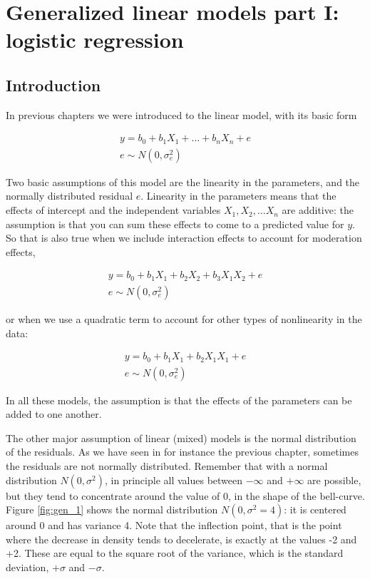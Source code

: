 \documentclass[]{report}\usepackage[]{graphicx}\usepackage[]{color}
\begin{document}
\chapter{Generalized linear models part I: logistic regression}\label{chap:logistic}

\section{Introduction}
In previous chapters we were introduced to the linear model, with its basic form


\begin{eqnarray}
y = b_0 + b_1 X_1 + \dots + b_n X_n + e \\
e \sim N(0, \sigma_e^2)
\end{eqnarray}

Two basic assumptions of this model are the linearity in the parameters, and the normally distributed residual $e$. Linearity in the parameters means that the effects of intercept and the independent variables $X_1, X_2, \dots X_n$ are additive: the assumption is that you can sum these effects to come to a predicted value for $y$. So that is also true when we include interaction effects to account for moderation effects,

\begin{eqnarray}
y = b_0 + b_1 X_1 +  b_2 X_2 + b_3 X_1 X_2 + e \\
e \sim N(0, \sigma_e^2)
\end{eqnarray}


or when we use a quadratic term to account for other types of nonlinearity in the data:


\begin{eqnarray}
y = b_0 + b_1 X_1 +  b_2 X_1 X_1 + e \\
e \sim N(0, \sigma_e^2)
\end{eqnarray}

In all these models, the assumption is that the effects of the parameters can be added to one another.

The other major assumption of linear (mixed) models is the normal distribution of the residuals. As we have seen in for instance the previous chapter, sometimes the residuals are not normally distributed. Remember that with a normal distribution $N(0,\sigma^2)$, in principle all values between $-\infty$ and $+\infty$ are possible, but they tend to concentrate around the value of 0, in the shape of the bell-curve. Figure \ref{fig:gen_1} shows the normal distribution $N(0,\sigma^2=4)$: it is centered around 0 and has variance 4. Note that the inflection point, that is the point where the decrease in density tends to decelerate, is exactly at the values -2 and +2. These are equal to the square root of the variance, which is the standard deviation, $+\sigma$ and $-\sigma$.
\end{document}
